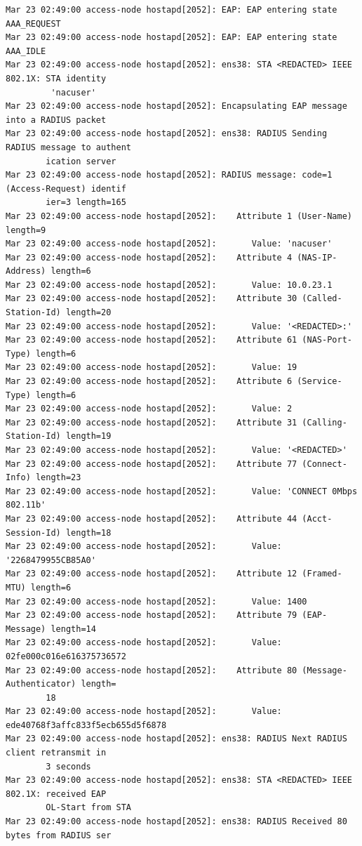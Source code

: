 \documentclass[11pt]{article}
\begin{document}
\begin{verbatim}
Mar 23 02:49:00 access-node hostapd[2052]: EAP: EAP entering state AAA_REQUEST
Mar 23 02:49:00 access-node hostapd[2052]: EAP: EAP entering state AAA_IDLE
Mar 23 02:49:00 access-node hostapd[2052]: ens38: STA <REDACTED> IEEE 802.1X: STA identity
         'nacuser'
Mar 23 02:49:00 access-node hostapd[2052]: Encapsulating EAP message into a RADIUS packet
Mar 23 02:49:00 access-node hostapd[2052]: ens38: RADIUS Sending RADIUS message to authent
        ication server
Mar 23 02:49:00 access-node hostapd[2052]: RADIUS message: code=1 (Access-Request) identif
        ier=3 length=165
Mar 23 02:49:00 access-node hostapd[2052]:    Attribute 1 (User-Name) length=9
Mar 23 02:49:00 access-node hostapd[2052]:       Value: 'nacuser'
Mar 23 02:49:00 access-node hostapd[2052]:    Attribute 4 (NAS-IP-Address) length=6
Mar 23 02:49:00 access-node hostapd[2052]:       Value: 10.0.23.1
Mar 23 02:49:00 access-node hostapd[2052]:    Attribute 30 (Called-Station-Id) length=20
Mar 23 02:49:00 access-node hostapd[2052]:       Value: '<REDACTED>:'
Mar 23 02:49:00 access-node hostapd[2052]:    Attribute 61 (NAS-Port-Type) length=6
Mar 23 02:49:00 access-node hostapd[2052]:       Value: 19
Mar 23 02:49:00 access-node hostapd[2052]:    Attribute 6 (Service-Type) length=6
Mar 23 02:49:00 access-node hostapd[2052]:       Value: 2
Mar 23 02:49:00 access-node hostapd[2052]:    Attribute 31 (Calling-Station-Id) length=19
Mar 23 02:49:00 access-node hostapd[2052]:       Value: '<REDACTED>'
Mar 23 02:49:00 access-node hostapd[2052]:    Attribute 77 (Connect-Info) length=23
Mar 23 02:49:00 access-node hostapd[2052]:       Value: 'CONNECT 0Mbps 802.11b'
Mar 23 02:49:00 access-node hostapd[2052]:    Attribute 44 (Acct-Session-Id) length=18
Mar 23 02:49:00 access-node hostapd[2052]:       Value: '2268479955CB85A0'
Mar 23 02:49:00 access-node hostapd[2052]:    Attribute 12 (Framed-MTU) length=6
Mar 23 02:49:00 access-node hostapd[2052]:       Value: 1400
Mar 23 02:49:00 access-node hostapd[2052]:    Attribute 79 (EAP-Message) length=14
Mar 23 02:49:00 access-node hostapd[2052]:       Value: 02fe000c016e616375736572
Mar 23 02:49:00 access-node hostapd[2052]:    Attribute 80 (Message-Authenticator) length=
        18
Mar 23 02:49:00 access-node hostapd[2052]:       Value: ede40768f3affc833f5ecb655d5f6878
Mar 23 02:49:00 access-node hostapd[2052]: ens38: RADIUS Next RADIUS client retransmit in 
        3 seconds
Mar 23 02:49:00 access-node hostapd[2052]: ens38: STA <REDACTED> IEEE 802.1X: received EAP
        OL-Start from STA
Mar 23 02:49:00 access-node hostapd[2052]: ens38: RADIUS Received 80 bytes from RADIUS ser

\end{verbatim}
\end{document}
